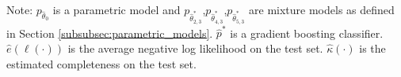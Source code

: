 \documentclass[11pt,a4paper]{article}
\theoremstyle{definition}
\begin{document}
\begin{table}[!ht]
\caption{Unrestricted completeness of heterogeneous parametric models}
\label{tab:unrest-completeness}
\centering
\begin{threeparttable}
\renewcommand{\TPTminimum}{\linewidth}
\begin{tablenotes}
      \footnotesize
      \item Note: $p_{\hat{\theta}_0}$ is a parametric model and $p_{\hat{\theta}_{2,3}^*}$,$p_{\hat{\theta}_{4,3}^*}$,$p_{\hat{\theta}_{5,3}^*}$  are mixture models as defined in Section \ref{subsubsec:parametric_models}.  $\hat{p}^*$ is a gradient boosting classifier.  $\hat{e}(\ell(\cdot))$ is the average negative log likelihood on the test set. $\hat{\kappa}(\cdot)$ is the estimated completeness on the test set.
    \end{tablenotes}
\end{threeparttable}
\end{table}
\end{document}
